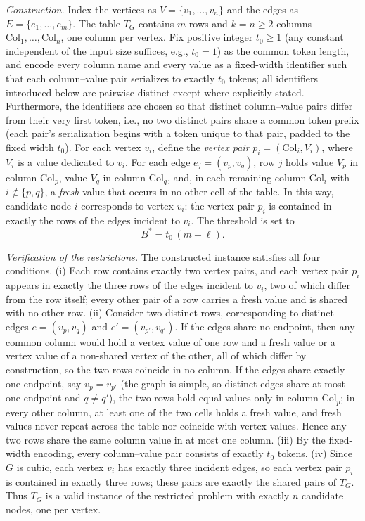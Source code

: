 \emph{Construction.}
Index the vertices as $V=\{v_1,\dots,v_n\}$ and the edges as $E=\{e_1,\dots,e_m\}$. The table $T_G$ contains $m$ rows and $k=n\geq 2$ columns $\mathrm{Col}_1,\dots,\mathrm{Col}_n$, one column per vertex. Fix positive integer $t_0\geq 1$ (any constant independent of the input size suffices, e.g., $t_0=1$) as the common token length, and encode every column name and every value as a fixed-width identifier such that each column--value pair serializes to exactly $t_0$ tokens; all identifiers introduced below are pairwise distinct except where explicitly stated. Furthermore, the identifiers are chosen so that distinct column--value pairs differ from their very first token, i.e., no two distinct pairs share a common token prefix (each pair's serialization begins with a token unique to that pair, padded to the fixed width $t_0$). For each vertex $v_i$, define the \emph{vertex pair} $p_i=(\mathrm{Col}_i, V_i)$, where $V_i$ is a value dedicated to $v_i$. For each edge $e_j=(v_p,v_q)$, row $j$ holds value $V_p$ in column $\mathrm{Col}_p$, value $V_q$ in column $\mathrm{Col}_q$, and, in each remaining column $\mathrm{Col}_i$ with $i\notin\{p,q\}$, a \emph{fresh} value that occurs in no other cell of the table. In this way, candidate node $i$ corresponds to vertex $v_i$: the vertex pair $p_i$ is contained in exactly the rows of the edges incident to $v_i$. The threshold is set to
\[
B^{*}=t_0\,(m-\ell).
\]

\emph{Verification of the restrictions.}
The constructed instance satisfies all four conditions.
(i) Each row contains exactly two vertex pairs, and each vertex pair $p_i$ appears in exactly the three rows of the edges incident to $v_i$, two of which differ from the row itself; every other pair of a row carries a fresh value and is shared with no other row.
(ii) Consider two distinct rows, corresponding to distinct edges $e=(v_p,v_q)$ and $e'=(v_{p'},v_{q'})$. If the edges share no endpoint, then any common column would hold a vertex value of one row and a fresh value or a vertex value of a non-shared vertex of the other, all of which differ by construction, so the two rows coincide in no column. If the edges share exactly one endpoint, say $v_p=v_{p'}$ (the graph is simple, so distinct edges share at most one endpoint and $q\neq q'$), the two rows hold equal values only in column $\mathrm{Col}_p$; in every other column, at least one of the two cells holds a fresh value, and fresh values never repeat across the table nor coincide with vertex values. Hence any two rows share the same column value in at most one column.
(iii) By the fixed-width encoding, every column--value pair consists of exactly $t_0$ tokens.
(iv) Since $G$ is cubic, each vertex $v_i$ has exactly three incident edges, so each vertex pair $p_i$ is contained in exactly three rows; these pairs are exactly the shared pairs of $T_G$.
Thus $T_G$ is a valid instance of the restricted problem with exactly $n$ candidate nodes, one per vertex.

